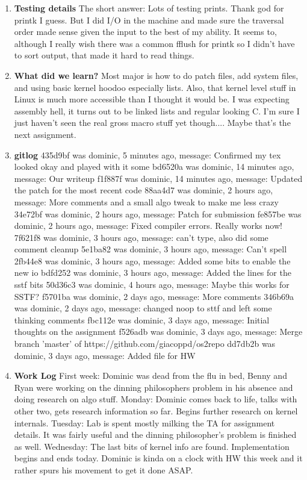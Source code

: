 \documentclass[IEEEtran,letterpaper,10pt,notitlepage,draftclsnofoot,onecolumn]{article}
\begin{document}
\begin{enumerate}
\item
\textbf{Testing details}
The short answer: Lots of testing prints. Thank god for
printk I guess. But I did I/O in the machine and made sure
the traversal order made sense given the input to the best
of my ability. It seems to, although I really wish there
was a common fflush for printk so I didn't have to sort 
output, that made it hard to read things.
\item
\textbf{What did we learn?}
Most major is how to do patch files, add system files,
and using basic kernel hoodoo especially lists.
Also, that kernel level stuff in Linux is much more
accessible than I thought it would be. I was expecting
assembly hell, it turns out to be linked lists and regular
looking C. I'm sure I just haven't seen the real gross
macro stuff yet though....
Maybe that's the next assignment.
\item
\textbf{gitlog}
435d9bf was dominic, 5 minutes ago, message: Confirmed my tex looked okay and played with it some
bd6520a was dominic, 14 minutes ago, message: Our writeup
f1f887f was dominic, 14 minutes ago, message: Updated the patch for the most recent code
88aa4d7 was dominic, 2 hours ago, message: More comments and a small algo tweak to make me less crazy
34e72bf was dominic, 2 hours ago, message: Patch for submission
fe857be was dominic, 2 hours ago, message: Fixed compiler errors. Really works now!
7f621f8 was dominic, 3 hours ago, message: can't type, also did some comment cleanup
5e1ba82 was dominic, 3 hours ago, message: Can't spell
2fb44e8 was dominic, 3 hours ago, message: Added some bits to enable the new io
bdfd252 was dominic, 3 hours ago, message: Added the lines for the sstf bits
50d36c3 was dominic, 4 hours ago, message: Maybe this works for SSTF?
f5701ba was dominic, 2 days ago, message: More comments
346b69a was dominic, 2 days ago, message: changed noop to sttf and left some thinking comments
fbc112e was dominic, 3 days ago, message: Initial thoughts on the assignment
f526adb was dominic, 3 days ago, message: Merge branch 'master' of https://github.com/giacoppd/os2repo
dd7db2b was dominic, 3 days ago, message: Added file for HW
\item
\textbf{Work Log}
First week: Dominic was dead from the flu in bed, 
Benny and Ryan were working on the dinning philosophers
problem in his absence and doing research on algo stuff.
Monday: Dominic comes back to life, talks with other two,
gets research information so far. Begins further research
on kernel internals.
Tuesday: Lab is spent mostly milking the TA for assignment details.
It was fairly useful and the dinning philosopher's problem is
finished as well.
Wednesday: The last bits of kernel info are found. Implementation
begins and ends today. Dominic is kinda on a clock with HW this 
week and it rather spurs his movement to get it done ASAP.

\end{enumerate}
\end{document}
